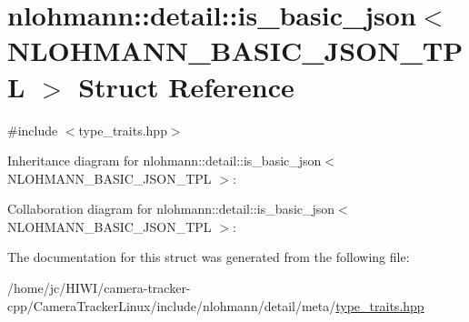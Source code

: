 \hypertarget{structnlohmann_1_1detail_1_1is__basic__json_3_01_n_l_o_h_m_a_n_n___b_a_s_i_c___j_s_o_n___t_p_l_01_4}{}\section{nlohmann\+:\+:detail\+:\+:is\+\_\+basic\+\_\+json$<$ N\+L\+O\+H\+M\+A\+N\+N\+\_\+\+B\+A\+S\+I\+C\+\_\+\+J\+S\+O\+N\+\_\+\+T\+PL $>$ Struct Reference}
\label{structnlohmann_1_1detail_1_1is__basic__json_3_01_n_l_o_h_m_a_n_n___b_a_s_i_c___j_s_o_n___t_p_l_01_4}


{\ttfamily \#include $<$type\+\_\+traits.\+hpp$>$}



Inheritance diagram for nlohmann\+:\+:detail\+:\+:is\+\_\+basic\+\_\+json$<$ N\+L\+O\+H\+M\+A\+N\+N\+\_\+\+B\+A\+S\+I\+C\+\_\+\+J\+S\+O\+N\+\_\+\+T\+PL $>$\+:


Collaboration diagram for nlohmann\+:\+:detail\+:\+:is\+\_\+basic\+\_\+json$<$ N\+L\+O\+H\+M\+A\+N\+N\+\_\+\+B\+A\+S\+I\+C\+\_\+\+J\+S\+O\+N\+\_\+\+T\+PL $>$\+:


The documentation for this struct was generated from the following file\+:\begin{DoxyCompactItemize}
\item 
/home/jc/\+H\+I\+W\+I/camera-\/tracker-\/cpp/\+Camera\+Tracker\+Linux/include/nlohmann/detail/meta/\hyperlink{type__traits_8hpp}{type\+\_\+traits.\+hpp}\end{DoxyCompactItemize}
